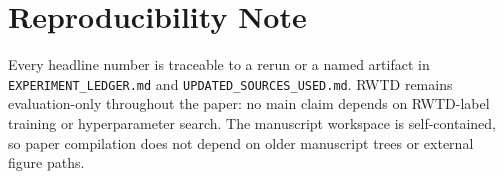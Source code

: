 \section{Reproducibility Note}
\label{sec:repro}

Every headline number is traceable to a rerun or a named artifact in \texttt{EXPERIMENT\_LEDGER.md} and \texttt{UPDATED\_SOURCES\_USED.md}. RWTD remains evaluation-only throughout the paper: no main claim depends on RWTD-label training or hyperparameter search. The manuscript workspace is self-contained, so paper compilation does not depend on older manuscript trees or external figure paths.
